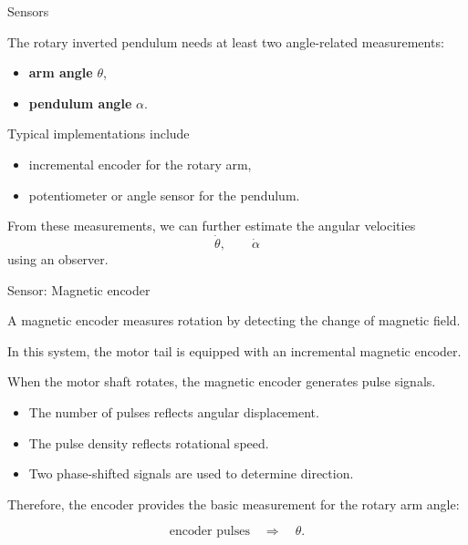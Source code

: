 \documentclass[aspectratio=169]{beamer}
\begin{document}
\begin{frame}{Sensors}

The rotary inverted pendulum needs at least two angle-related measurements:

\begin{itemize}
    \item \textbf{arm angle} $\theta$,
    \item \textbf{pendulum angle} $\alpha$.
\end{itemize}

\vspace{0.3cm}
Typical implementations include
\begin{itemize}
    \item incremental encoder for the rotary arm,
    \item potentiometer or angle sensor for the pendulum.
\end{itemize}

\vspace{0.3cm}
From these measurements, we can further estimate the angular velocities
\[
\dot{\theta}, \qquad \dot{\alpha}
\]
using an observer.
\end{frame}


\begin{frame}{Sensor: Magnetic encoder}

A magnetic encoder measures rotation by detecting the change of magnetic field.

\vspace{0.25cm}
In this system, the motor tail is equipped with an incremental magnetic encoder.

\vspace{0.25cm}
When the motor shaft rotates, the magnetic encoder generates pulse signals.

\begin{itemize}
    \item The number of pulses reflects angular displacement.
    \item The pulse density reflects rotational speed.
    \item Two phase-shifted signals are used to determine direction.
\end{itemize}

\vspace{0.25cm}
Therefore, the encoder provides the basic measurement for the rotary arm angle:

\[
\text{encoder pulses}
\quad \Longrightarrow \quad
\theta .
\]

\end{frame}
\end{document}
